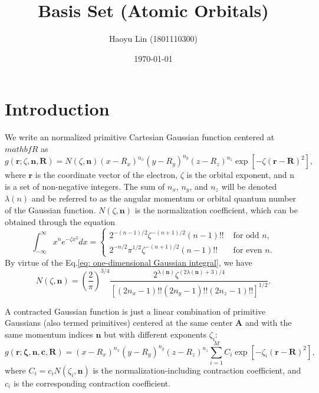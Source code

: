\documentclass[11pt,a4paper]{article}
\title{Basis Set (Atomic Orbitals)}
\author{Haoyu Lin (1801110300)}
\date{\today}
\begin{document}
	
	\maketitle
	
	\section{Introduction}
	We write an normalized primitive Cartesian Gaussian function centered at $mathbf{R}$ as
	\begin{equation}
		g(\mathbf{r}; \zeta, \mathbf{n}, \mathbf{R}) = N(\zeta, \mathbf{n}) \left(x-R_{x}\right)^{n_{x}} \left(y-R_{y}\right)^{n_{y}} \left(z-R_{z}\right)^{n_{z}} \exp \left[ -\zeta (\mathbf{r} - \mathbf{R})^2 \right],
	\end{equation}
	where $\mathbf{r}$ is the coordinate vector of the electron, $\zeta$ is the orbital exponent, and n is a set of non-negative integers. The sum of $n_{x}$, $n_{y}$, and $n_{z}$ will be denoted $\lambda(n)$ and be referred to as the angular momentum or orbital quantum number of the Gaussian function. $N(\zeta, \mathbf{n})$ is the normalization coefficient, which can be obtained through the equation
	\begin{equation}
		\int_{-\infty}^{\infty} x^{n} e^{-\zeta x^{2}} d x = \left\{
		\begin{array}{ll}
			2^{-(n-1)/2} \zeta^{-(n+1)/2}(n-1)!! & {\text{    for odd } n,} \\
			2^{-n/2} \pi^{1/2} \zeta^{-(n+1)/2}(n-1)!! & {\text{    for even } n.}
		\end{array}\right.
		\label{eq: one-dimensional Gaussian integral}
	\end{equation}
	By virtue of the Eq.\eqref{eq: one-dimensional Gaussian integral}, we have
	\begin{equation}
		N(\zeta, \mathbf{n}) = \left(\frac{2}{\pi}\right)^{3 / 4} \frac{2^{\lambda(\mathbf{n})} \zeta^{(2 \lambda(\mathbf{n})+3) / 4}}{\left[\left(2 n_{x}-1\right) ! !\left(2 n_{y}-1\right) ! !\left(2 n_{z}-1\right) ! !\right]^{1 / 2}}.
	\end{equation}
	
	A contracted Gaussian function is just a linear combination of primitive Gaussians (also termed primitives) centered at the same center $\mathbf{A}$ and with the same momentum indices $\mathbf{n}$ but with different exponents $\zeta_i$:
	\begin{equation}
		g(\mathbf{r}; \boldsymbol{\zeta}, \mathbf{n}, \mathbf{c}, \mathbf{R}) = \left(x-R_{x}\right)^{n_{x}} \left(y-R_{y}\right)^{n_{y}} \left(z-R_{z}\right)^{n_{z}} \sum_{i=1}^{M} C_i \exp \left[ -\zeta_i (\mathbf{r} - \mathbf{R})^2 \right],
	\end{equation}
	where $C_i = c_i N(\zeta_i, \mathbf{n})$ is the normalization-including contraction coefficient, and $c_i$ is the corresponding contraction coefficient.
	
\end{document}
